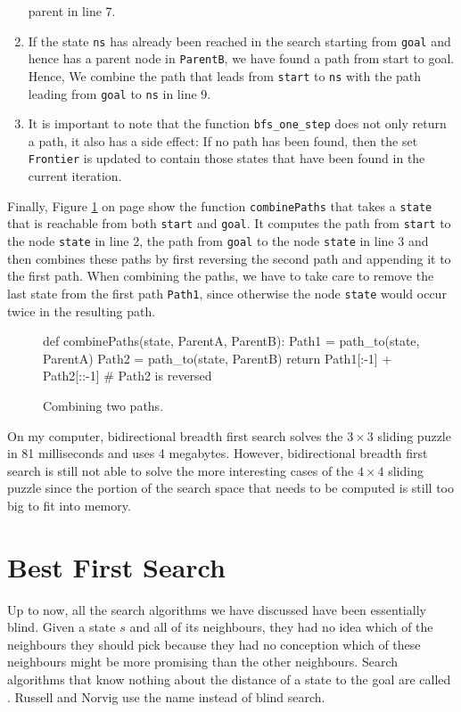 \begin{enumerate}
      parent in line 7.
\item If the state \texttt{ns} has already been reached in the search starting from \texttt{goal} and hence has
      a parent node in \texttt{ParentB}, we have found a path from start to goal.  Hence, We combine the path that
      leads from \texttt{start} to \texttt{ns} with the path leading from \texttt{goal} to \texttt{ns} in line 9.
\item It is important to note that the function \texttt{bfs\_one\_step} does not only return a path, it also
      has a side effect: If no path has been found, then the set \texttt{Frontier} is updated to contain those
      states that have been found in the current iteration.
\end{enumerate}
Finally, Figure \ref{fig:combine-paths.stlx} on page \pageref{fig:combine-paths.stlx} show the function
\texttt{combinePaths} that takes a \texttt{state} that is reachable from both \texttt{start} and \texttt{goal}.
It computes the path from \texttt{start} to the node \texttt{state} in line 2, the path from \texttt{goal} to
the node \texttt{state} in line 3 and then combines these paths by first reversing the second path and
appending it to the first path.  When combining the paths, we have to take care to remove the last state from
the first path \texttt{Path1}, since otherwise the node \texttt{state} would occur twice in the resulting path.

\begin{figure}[!ht]
\centering
\begin{python3code}
    def combinePaths(state, ParentA, ParentB):
            Path1 = path_to(state, ParentA)
            Path2 = path_to(state, ParentB)
            return Path1[:-1] + Path2[::-1] # Path2 is reversed
\end{python3code}
\vspace*{-0.3cm}
\caption{Combining two paths.}
\label{fig:combine-paths.stlx}
\end{figure}
On my computer, bidirectional breadth first search solves the $3 \times 3$ sliding puzzle in 81
milliseconds and uses 4 megabytes.  However, bidirectional breadth first search is still not able to solve the
more interesting cases of the $4 \times 4$ sliding puzzle since the portion of the search space that needs to
be computed is still too big to fit into memory. 

\section{Best First Search}
Up to now, all the search algorithms we have discussed have been essentially blind.  Given a state $s$ and
all of its neighbours, they had no idea which of the neighbours they should pick because they had no conception
which of these neighbours might be more promising than the other neighbours.  Search algorithms that know nothing
about the distance of a state to the goal are called .  
Russell and Norvig \cite{russell:2020} use the name  instead of blind search.

